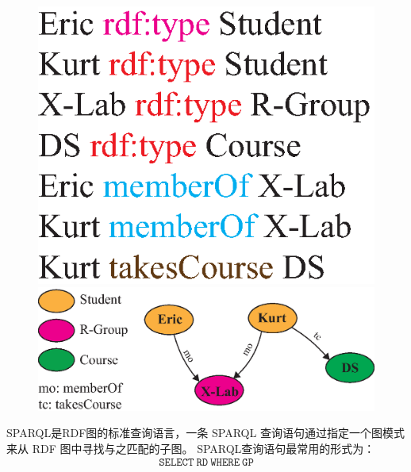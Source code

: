 \begin{figure}[htb]
\centering
\begin{minipage}{.32\linewidth}
\centering\includegraphics[scale=0.5]{figures/rdfdata.eps}
\end{minipage}
\begin{minipage}{.53\linewidth}
\centering\includegraphics[scale=0.5]{figures/rdf.eps}
\end{minipage}
\begin{minipage}{1\linewidth}
\label{rdf}
\end{minipage}
\end{figure}

SPARQL是RDF图的标准查询语言，一条 SPARQL 查询语句通过指定一个图模式来从 RDF 图中寻找与之匹配的子图。
SPARQL查询语句最常用的形式为：
\begin{eqnarray}
    \mathtt{SELECT \ RD \ WHERE \ GP}
\end{eqnarray}

